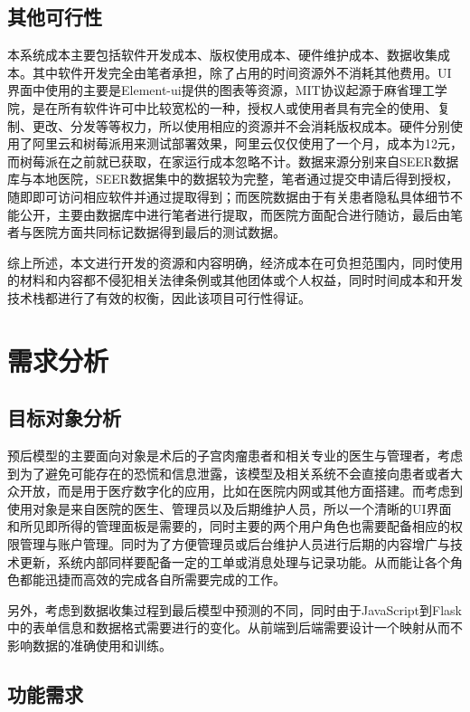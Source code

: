 \subsection{其他可行性}

本系统成本主要包括软件开发成本、版权使用成本、硬件维护成本、数据收集成本。其中软件开发完全由笔者承担，除了占用的时间资源外不消耗其他费用。UI界面中使用的主要是Element-ui提供的图表等资源，MIT协议起源于麻省理工学院，是在所有软件许可中比较宽松的一种，授权人或使用者具有完全的使用、复制、更改、分发等等权力，所以使用相应的资源并不会消耗版权成本。硬件分别使用了阿里云和树莓派用来测试部署效果，阿里云仅仅使用了一个月，成本为12元，而树莓派在之前就已获取，在家运行成本忽略不计。数据来源分别来自SEER数据库与本地医院，SEER数据集中的数据较为完整，笔者通过提交申请后得到授权，随即即可访问相应软件并通过提取得到；而医院数据由于有关患者隐私具体细节不能公开，主要由数据库中进行笔者进行提取，而医院方面配合进行随访，最后由笔者与医院方面共同标记数据得到最后的测试数据。

综上所述，本文进行开发的资源和内容明确，经济成本在可负担范围内，同时使用的材料和内容都不侵犯相关法律条例或其他团体或个人权益，同时时间成本和开发技术栈都进行了有效的权衡，因此该项目可行性得证。

\section{需求分析}

\subsection{目标对象分析}

预后模型的主要面向对象是术后的子宫肉瘤患者和相关专业的医生与管理者，考虑到为了避免可能存在的恐慌和信息泄露，该模型及相关系统不会直接向患者或者大众开放，而是用于医疗数字化的应用，比如在医院内网或其他方面搭建。而考虑到使用对象是来自医院的医生、管理员以及后期维护人员，所以一个清晰的UI界面和所见即所得的管理面板是需要的，同时主要的两个用户角色也需要配备相应的权限管理与账户管理。同时为了方便管理员或后台维护人员进行后期的内容增广与技术更新，系统内部同样要配备一定的工单或消息处理与记录功能。从而能让各个角色都能迅捷而高效的完成各自所需要完成的工作。

另外，考虑到数据收集过程到最后模型中预测的不同，同时由于JavaScript到Flask中的表单信息和数据格式需要进行的变化。从前端到后端需要设计一个映射从而不影响数据的准确使用和训练。

\subsection{功能需求}

